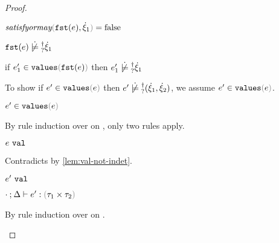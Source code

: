\begin{proof}
\begin{byCases}
\begin{byCases}
\begin{byCases}
\begin{byCases}
          \item[\false] 
          \begin{pfsteps*}
          \item $\fsatisfyormay{\hfst{e}}{\hxi_1}=\false$  
          \item $\cnotsatisfyormay{\hfst{e}}{\hxi_1}$  
          \item if $\inValues{e_1'}{\hfst{e}}$ then $\cnotsatisfyormay{e_1'}{\hxi_1}$  
          \end{pfsteps*} 
          To show if $\inValues{e'}{e}$ then $\cnotsatisfyormay{e'}{\cpair{\hxi_1}{\hxi_2}}$, we assume $\inValues{e'}{e}$.
          \begin{pfsteps*}
          \item $\inValues{e'}{e}$  
          \end{pfsteps*}
          By rule induction over  on , only two rules apply.
          \begin{byCases}
            \item[\text{(\ref{rule:IVVal})}]
            \begin{pfsteps*}
            \item $e ~\mathtt{val}$ 
            \end{pfsteps*} 
            Contradicts  by \autoref{lem:val-not-indet}.
            \item[\text{(\ref{rule:IVIndet})}] 
            \begin{pfsteps*}
            \item $e' ~\mathtt{val}$  
            \item $\hexptyp{\cdot}{\Delta}{e'}{\tprod{\tau_1}{\tau_2}}$  
            \end{pfsteps*}
            By rule induction over  on .
            \begin{byCases}
              \item[\text{(\ref{rule:VNum})}]
              \begin{pfsteps*}

\end{pfsteps*}
\end{byCases}
\end{byCases}
\end{byCases}
\end{byCases}
\end{byCases}
\end{byCases}
\end{proof}
